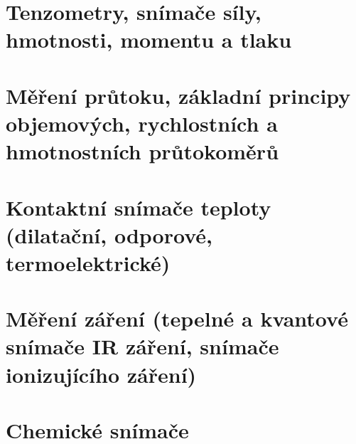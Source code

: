 \section{Tenzometry, snímače síly, hmotnosti, momentu a tlaku }


\section{Měření průtoku, základní principy objemových, rychlostních a hmotnostních průtokoměrů}


\section{Kontaktní snímače teploty (dilatační, odporové, termoelektrické)}


\section{Měření záření (tepelné a kvantové snímače IR záření, snímače ionizujícího záření)}


\section{Chemické snímače}